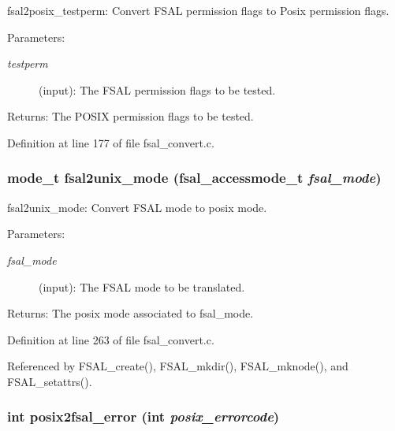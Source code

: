 fsal2posix\_\-testperm: Convert FSAL permission flags to Posix permission flags.

\begin{Desc}
\item[Parameters:]
\begin{description}
\item[{\em testperm}](input): The FSAL permission flags to be tested.\end{description}
\end{Desc}
\begin{Desc}
\item[Returns:]The POSIX permission flags to be tested. \end{Desc}


Definition at line 177 of file fsal\_\-convert.c.
\subsubsection{\setlength{\rightskip}{0pt plus 5cm}mode\_\-t fsal2unix\_\-mode (fsal\_\-accessmode\_\-t {\em fsal\_\-mode})}\label{fsal__convert_8c_a5}


fsal2unix\_\-mode: Convert FSAL mode to posix mode.

\begin{Desc}
\item[Parameters:]
\begin{description}
\item[{\em fsal\_\-mode}](input): The FSAL mode to be translated.\end{description}
\end{Desc}
\begin{Desc}
\item[Returns:]The posix mode associated to fsal\_\-mode. \end{Desc}


Definition at line 263 of file fsal\_\-convert.c.

Referenced by FSAL\_\-create(), FSAL\_\-mkdir(), FSAL\_\-mknode(), and FSAL\_\-setattrs().
\subsubsection{\setlength{\rightskip}{0pt plus 5cm}int posix2fsal\_\-error (int {\em posix\_\-errorcode})}\label{fsal__convert_8c_a2}


